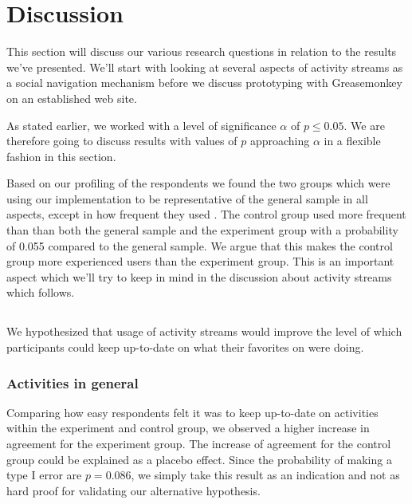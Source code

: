 \section{Discussion}

This section will discuss our various research questions in relation
to the results we've presented. We'll start with looking at
several aspects of activity streams as a social navigation
mechanism before we discuss prototyping with Greasemonkey on
an established web site.

As stated earlier, we worked with a level of significance
$\alpha$ of $p \leq 0.05$.%
We are therefore going to discuss results with values of $p$ approaching
$\alpha$ in a flexible fashion in this section.

Based on our profiling of the respondents%
we found the two groups which were using our implementation to be
representative of the general sample in all aspects, except in how
frequent they used \urort{}. The control group used \urort{} more
frequent than than both the general sample and the experiment group
with a probability of 0.055 compared to the general sample.
We argue that this makes the control group more experienced
\urort{} users than the experiment group.
This is an important aspect which we'll try to keep in mind in
the discussion about activity streams which follows.

\subsection{%
}

We hypothesized that usage of activity streams would improve the level
of which participants could keep up-to-date on what their favorites
on \urort{} were doing.

\subsubsection{Activities in general}

Comparing how easy respondents felt it was to keep up-to-date on activities
within the experiment and control group,%
we observed a higher increase in agreement for the experiment group. The
increase of agreement for the control group could be explained as
a placebo effect.
Since the probability of making a type I error are
$p = 0.086$, we simply take this result as an indication and not as hard proof
for validating our alternative hypothesis.

